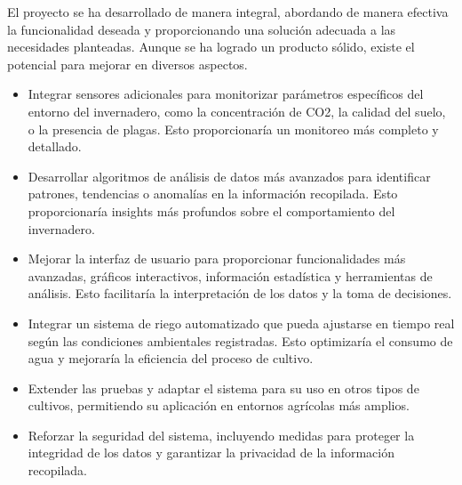 El proyecto se ha desarrollado de manera integral, abordando de manera efectiva la funcionalidad deseada y proporcionando una solución adecuada a las necesidades planteadas. Aunque se ha logrado un producto sólido, existe el potencial para mejorar en diversos aspectos. 

\begin{itemize}
\item Integrar sensores adicionales para monitorizar parámetros específicos del entorno del invernadero, como la concentración de CO2, la calidad del suelo, o la presencia de plagas. Esto proporcionaría un monitoreo más completo y detallado.
\item Desarrollar algoritmos de análisis de datos más avanzados para identificar patrones, tendencias o anomalías en la información recopilada. Esto proporcionaría insights más profundos sobre el comportamiento del invernadero.
\item Mejorar la interfaz de usuario para proporcionar funcionalidades más avanzadas, gráficos interactivos, información estadística y herramientas de análisis. Esto facilitaría la interpretación de los datos y la toma de decisiones.
\item Integrar un sistema de riego automatizado que pueda ajustarse en tiempo real según las condiciones ambientales registradas. Esto optimizaría el consumo de agua y mejoraría la eficiencia del proceso de cultivo.
\item Extender las pruebas y adaptar el sistema para su uso en otros tipos de cultivos, permitiendo su aplicación en entornos agrícolas más amplios.
\item Reforzar la seguridad del sistema, incluyendo medidas para proteger la integridad de los datos y garantizar la privacidad de la información recopilada.
\end{itemize}

